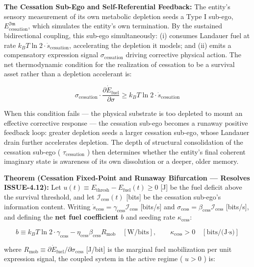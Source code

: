 \documentclass[11pt,a4paper]{article}
\theoremstyle{definition}
\theoremstyle{remark}
\begin{document}
\textbf{The Cessation Sub-Ego and Self-Referential Feedback:} The entity's sensory measurement of its own metabolic depletion seeds a Type I sub-ego, $E_{\text{cessation}}^{\mathfrak{Im}}$, which simulates the entity's own termination. By the sustained bidirectional coupling, this sub-ego simultaneously: (i) consumes Landauer fuel at rate $k_B T \ln 2 \cdot \dot{s}_{\text{cessation}}$, accelerating the depletion it models; and (ii) emits a compensatory expression signal $\sigma_{\text{cessation}}$ driving corrective physical action. The net thermodynamic condition for the realization of cessation to be a survival asset rather than a depletion accelerant is:


\begin{equation}
\boxed{\sigma_{\text{cessation}} \cdot \frac{\partial \dot{E}_{\text{fuel}}}{\partial \sigma} \geq k_B T \ln 2 \cdot \dot{s}_{\text{cessation}}}
\end{equation}


When this condition fails — the physical substrate is too depleted to mount an effective corrective response — the cessation sub-ego becomes a runaway positive feedback loop: greater depletion seeds a larger cessation sub-ego, whose Landauer drain further accelerates depletion. The depth of structural consolidation of the cessation sub-ego ( $\tau_{\text{cessation}}$ ) then determines whether the entity's final coherent imaginary state is awareness of its own dissolution or a deeper, older memory.

\textbf{Theorem (Cessation Fixed-Point and Runaway Bifurcation — Resolves ISSUE-4.12):} Let $u(t) \equiv E_{\text{thresh}} - E_{\text{fuel}}(t) \geq 0$ [J] be the fuel deficit above the survival threshold, and let $\mathcal{I}_{\text{cess}}(t)$ [bits] be the cessation sub-ego's information content. Writing $\dot{s}_{\text{cess}} = \gamma_{\text{cess}} \mathcal{I}_{\text{cess}}$ [bits/s] and $\sigma_{\text{cess}} = \beta_{\text{cess}} \mathcal{I}_{\text{cess}}$ [bits/s], and defining the \textbf{net fuel coefficient} $b$ and seeding rate $\kappa_{\text{cess}}$:


\begin{equation}
b \equiv k_B T \ln 2 \cdot \gamma_{\text{cess}} - \eta_{\text{cess}}\beta_{\text{cess}} R_{\text{mob}} \quad [\text{W/bits}], \qquad \kappa_{\text{cess}} > 0 \quad [\text{bits/(J·s)}]
\end{equation}


where $R_{\text{mob}} \equiv \partial \dot{E}_{\text{fuel}} / \partial \sigma_{\text{cess}}$ [J/bit] is the marginal fuel mobilization per unit expression signal, the coupled system in the active regime ( $u > 0$ ) is:
\end{document}
